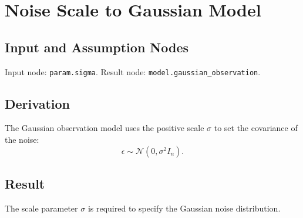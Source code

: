\section{Noise Scale to Gaussian Model}
\label{edge:sigma-to-gaussian-model}

\subsection{Input and Assumption Nodes}
Input node: \texttt{param.sigma}. Result node: \texttt{model.gaussian\_observation}.

\subsection{Derivation}
The Gaussian observation model uses the positive scale \(\sigma\) to set the covariance of the noise:
\[
  \epsilon \sim \mathcal{N}(0,\sigma^2 I_n).
\]

\subsection{Result}
The scale parameter \(\sigma\) is required to specify the Gaussian noise distribution.
